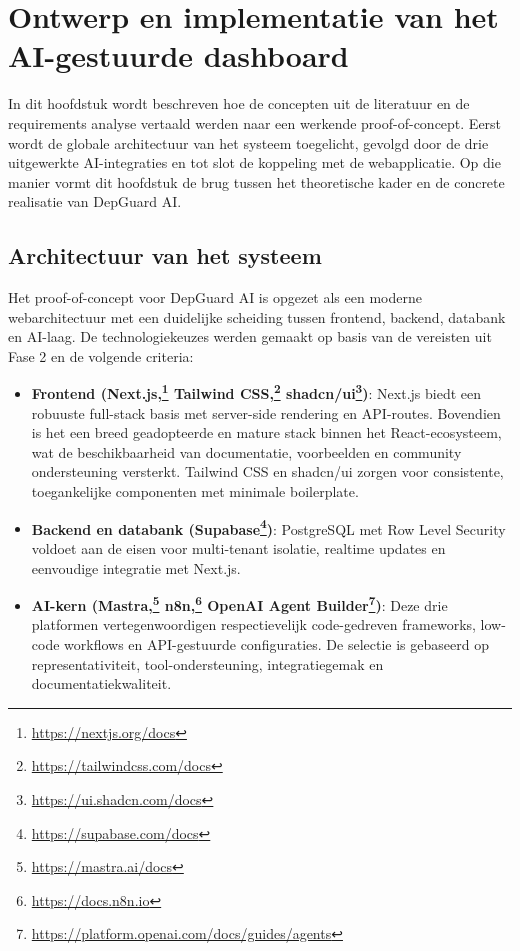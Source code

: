
\chapter{Ontwerp en implementatie van het AI-gestuurde dashboard}
\label{ch:implementatie}

In dit hoofdstuk wordt beschreven hoe de concepten uit de literatuur en de requirements analyse vertaald werden naar een werkende proof-of-concept. Eerst wordt de globale architectuur van het systeem toegelicht, gevolgd door de drie uitgewerkte AI-integraties en tot slot de koppeling met de webapplicatie. Op die manier vormt dit hoofdstuk de brug tussen het theoretische kader en de concrete realisatie van DepGuard AI.

\section{Architectuur van het systeem}

Het proof-of-concept voor DepGuard AI is opgezet als een moderne webarchitectuur met een duidelijke scheiding tussen frontend, backend, databank en AI-laag. De technologiekeuzes werden gemaakt op basis van de vereisten uit Fase 2 en de volgende criteria:

\begin{itemize}
    \item \textbf{Frontend (Next.js,\footnote{\url{https://nextjs.org/docs}} Tailwind CSS,\footnote{\url{https://tailwindcss.com/docs}} shadcn/ui\footnote{\url{https://ui.shadcn.com/docs}})}: Next.js biedt een robuuste full-stack basis met server-side rendering en API-routes. Bovendien is het een breed geadopteerde en mature stack binnen het React-ecosysteem, wat de beschikbaarheid van documentatie, voorbeelden en community ondersteuning versterkt. Tailwind CSS en shadcn/ui zorgen voor consistente, toegankelijke componenten met minimale boilerplate.
    \item \textbf{Backend en databank (Supabase\footnote{\url{https://supabase.com/docs}})}: PostgreSQL met Row Level Security voldoet aan de eisen voor multi-tenant isolatie, realtime updates en eenvoudige integratie met Next.js.
    \item \textbf{AI-kern (Mastra,\footnote{\url{https://mastra.ai/docs}} n8n,\footnote{\url{https://docs.n8n.io}} OpenAI Agent Builder\footnote{\url{https://platform.openai.com/docs/guides/agents}})}: Deze drie platformen vertegenwoordigen respectievelijk code-gedreven frameworks, low-code workflows en API-gestuurde configuraties. De selectie is gebaseerd op representativiteit, tool-ondersteuning, integratiegemak en documentatiekwaliteit.
\end{itemize}

